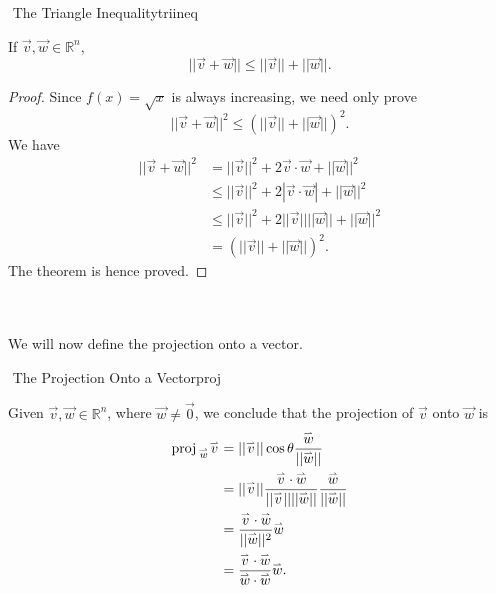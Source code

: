         \begin{theorem}{\Stop\,\,The Triangle Inequality}{triineq}
        
            If \(\vec{v},\vec{w}\in\mathbb{R}^n\),
            \begin{equation*}
                ||\vec{v}+\vec{w}||\leq||\vec{v}||+||\vec{w}||.
            \end{equation*}
            \begin{proof}
                Since \(f(x)=\sqrt{x}\) is always increasing, we need only prove
                \begin{equation*}
                    ||\vec{v}+\vec{w}||^2\leq(||\vec{v}||+||\vec{w}||)^2.
                \end{equation*}
                We have
                \begin{align*}
                    ||\vec{v}+\vec{w}||^2&=||\vec{v}||^2+2\vec{v}\cdot\vec{w}+||\vec{w}||^2 \\
                    &\leq||\vec{v}||^2+2|\vec{v}\cdot\vec{w}|+||\vec{w}||^2 \\
                    &\leq||\vec{v}||^2+2||\vec{v}||||\vec{w}||+||\vec{w}||^2 \\
                    &=(||\vec{v}||+||\vec{w}||)^2.
                \end{align*}
                The theorem is hence proved.
            \end{proof}
        
        \end{theorem}
        \vphantom
        \\
        \\
        We will now define the projection onto a vector.
        \begin{definition}{\Stop\,\,The Projection Onto a Vector}{proj}
        
            Given \(\vec{v},\vec{w}\in\mathbb{R}^n\), where \(\vec{w}\neq\vec{0}\), we conclude that the projection of \(\vec{v}\) onto \(\vec{w}\) is
            \begin{align*}
                \text{proj\,}_{\overset{_{\rightharpoonup}}{w}}{\overset{_{\rightharpoonup}}{v}}&=||\overset{_{\rightharpoonup}}{v}||\cos\theta\frac{\overset{_{\rightharpoonup}}{w}}{||\overset{_{\rightharpoonup}}{w}||} \\
                &=||\overset{_{\rightharpoonup}}{v}||\frac{\overset{_{\rightharpoonup}}{v}\cdot\overset{_{\rightharpoonup}}{w}}{||\overset{_{\rightharpoonup}}{v}||||\overset{_{\rightharpoonup}}{w}||}\frac{\overset{_{\rightharpoonup}}{w}}{||\overset{_{\rightharpoonup}}{w}||} \\
                &=\frac{\overset{_{\rightharpoonup}}{v}\cdot\overset{_{\rightharpoonup}}{w}}{||\overset{_{\rightharpoonup}}{w}||^2}\overset{_{\rightharpoonup}}{w} \\
                &=\frac{\overset{_{\rightharpoonup}}{v}\cdot\overset{_{\rightharpoonup}}{w}}{\overset{_{\rightharpoonup}}{w}\cdot\overset{_{\rightharpoonup}}{w}}\overset{_{\rightharpoonup}}{w}.
            \end{align*}
            
        \end{definition}
